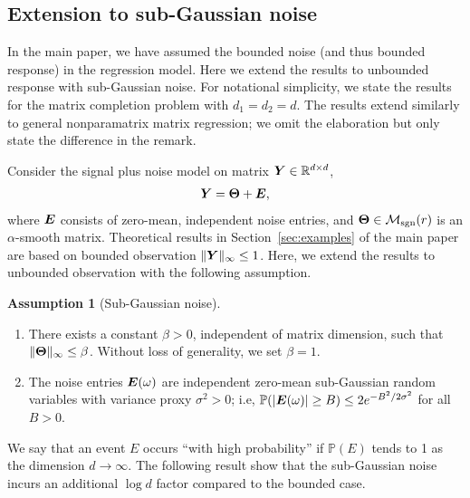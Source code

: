 \documentclass[11pt]{article}
\theoremstyle{plain}
\theoremstyle{definition}
\newtheorem{assumption}{Assumption}
\def\caliM{\tM_{\textup{sgn}}}
\def\caliM{\tM_{\textup{sgn}}}
\begin{document}
\subsection{Extension to sub-Gaussian noise}\label{sec:sub-Gaussian}
In the main paper, we have assumed the bounded noise (and thus bounded response) in the regression model. Here we extend the results to unbounded response with sub-Gaussian noise. For notational simplicity, we state the results for the matrix completion problem with $d_1=d_2=d$. The results extend similarly to general nonparamatrix matrix regression; we omit the elaboration but only state the difference in the remark. 

Consider the signal plus noise model on matrix $\bm Y\in\mathbb{R}^{d\times d}$,
\begin{align*}
\bm Y = \bm{\Theta}+\bm{E},
\end{align*}
where $\bm{E}$ consists of zero-mean, independent noise entries, and $\mTheta\in\caliM(r)$ is an $\alpha$-smooth matrix.
Theoretical results in Section~\ref{sec:examples} of the main paper are based on bounded observation $\|\bm Y\|_\infty\leq 1$. Here, we extend the results to unbounded observation with the following assumption.

\begin{assumption}[Sub-Gaussian noise]\label{assm:subg}\hfill

\begin{enumerate}
\item There exists a constant $\beta>0$, independent of matrix dimension, such that $\|\bm{\Theta}\|_\infty\leq \beta$. Without loss of generality, we set $\beta = 1$.
\item The noise entries $\bm{E}(\omega)$ are independent zero-mean sub-Gaussian random variables with variance proxy $\sigma^2>0$; i.e, $\mathbb{P}(|\bm{E}(\omega)|\geq B)\leq 2e^{-B^2/2\sigma^2}$ for all $B>0$.  
\end{enumerate}
\end{assumption}

We say that an event $E$ occurs ``with high probability'' if $\mathbb{P}(E)$ tends to 1 as the dimension $d\to \infty$. The following result show that the sub-Gaussian noise incurs an additional $\log d$ factor compared to the bounded case. 
\end{document}

